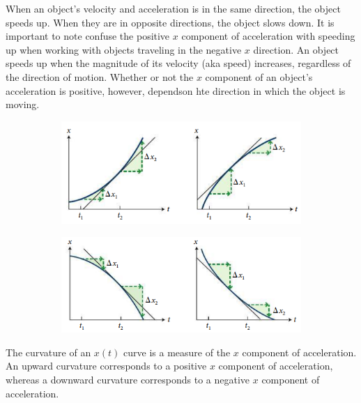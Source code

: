         When an object's velocity and acceleration is in the same direction, the object speeds up. When they are in opposite directions, the object slows down. It is important to note confuse the positive $x$ component
        of acceleration with speeding up when working with objects traveling in the negative $x$ direction. An object speeds up when the magnitude of its velocity (aka speed) increases, regardless of the direction of
        motion. Whether or not the $x$ component of an object's acceleration is positive, however, dependson hte direction in which the object is moving. \\

        \begin{figure}[hbt!]
            \centering
            \caption*{\textbf{Position-versus-time graphs for objects accelerating along the positive $\bm{x}$ axis:}}
            \begin{subfigure}[b]{.45\textwidth}
                \includegraphics[scale=1]{Resources/Position_Time_Graph_Acceleration}
            \end{subfigure}
            \begin{subfigure}[b]{.45\textwidth}
                \includegraphics[scale=1]{Resources/Position_Time_Graph_Acceleration2}
            \end{subfigure}
        \end{figure}

        The curvature of an $x(t)$ curve is a measure of the $x$ component of acceleration. An upward curvature corresponds to a positive $x$ component of acceleration, whereas a downward curvature corresponds to a
        negative $x$ component of acceleration.



